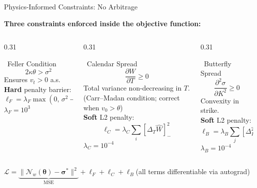 \documentclass[aspectratio=169, 10pt]{beamer}
\begin{document}
\begin{frame}{Physics-Informed Constraints: No Arbitrage}

  \textbf{Three constraints enforced inside the objective function:}
  \vspace{0.5em}

  \begin{columns}[T]
    \begin{column}{0.31\textwidth}
      \begin{block}{\faLock\ Feller Condition}
        \[ 2\kappa\theta > \sigma^2 \]
        \small Ensures $v_t>0$ a.s.\\[0.4em]
        \textbf{Hard} penalty barrier:
        \[\ell_F = \lambda_F\max(0,\,\sigma^2\!-\!2\kappa\theta)\]
        $\lambda_F = 10^3$
      \end{block}
    \end{column}

    \begin{column}{0.31\textwidth}
      \begin{block}{\faCalendar\ Calendar Spread}
        \[ \frac{\partial W}{\partial T} \ge 0 \]
        \small Total variance non-decreasing in $T$.\\[0.2em]
        {\tiny (Carr--Madan condition; correct when $v_0>\theta$)}\\ [0.2em]
        \textbf{Soft} L2 penalty:
        \[ \ell_C = \lambda_C\!\sum_i[\Delta_T\hat W]_-^2 \]
        $\lambda_C = 10^{-4}$
      \end{block}
    \end{column}

    \begin{column}{0.31\textwidth}
      \begin{block}{\faChartLine\ Butterfly Spread}
        \[ \frac{\partial^2\sigma}{\partial K^2} \ge 0 \]
        \small Convexity in strike.\\[0.4em]
        \textbf{Soft} L2 penalty:
        \[ \ell_B = \lambda_B\!\sum_j[\Delta^2_K\hat\sigma]_-^2 \]
        $\lambda_B = 10^{-4}$
      \end{block}
    \end{column}
  \end{columns}

  \vspace{0.5em}
  \begin{center}
    $\mathcal{L}
      = \underbrace{\|\mathcal{N}_w(\boldsymbol\theta)-\boldsymbol\sigma^*\|^2}_{\text{MSE}}
      + \ell_F + \ell_C + \ell_B
    $\quad\small(all terms differentiable via autograd)
  \end{center}
\end{frame}
\end{document}
